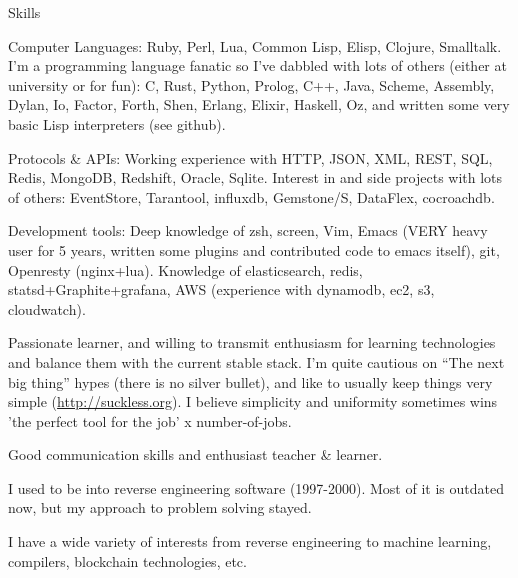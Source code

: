 \documentclass{resume} %
\begin{document}
\begin{rSection}{Skills}

\item Computer Languages: Ruby, Perl, Lua, Common Lisp, Elisp,
  Clojure, Smalltalk.  I'm a programming language fanatic so I've
  dabbled with lots of others (either at university or for fun):
  C, Rust, Python, Prolog, C++, Java, Scheme, Assembly, Dylan, Io, Factor,
  Forth, Shen, Erlang, Elixir, Haskell, Oz, and written some very
  basic Lisp interpreters (see github).

\item Protocols \& APIs: Working experience with HTTP, JSON, XML,
  REST, SQL, Redis, MongoDB, Redshift, Oracle, Sqlite. Interest in and
  side projects with lots of others: EventStore, Tarantool, influxdb,
  Gemstone/S, DataFlex, cocroachdb.

\item Development tools: Deep knowledge of zsh, screen, Vim, Emacs
  (VERY heavy user for 5 years, written some plugins and contributed
  code to emacs itself), git, Openresty (nginx+lua). Knowledge of
  elasticsearch, redis, statsd+Graphite+grafana, AWS (experience with
  dynamodb, ec2, s3, cloudwatch).

\item Passionate learner, and willing to transmit enthusiasm for
  learning technologies and balance them with the current stable
  stack. I'm quite cautious on ``The next big thing'' hypes (there is
  no silver bullet), and like to usually keep things very simple
  (\url{http://suckless.org}). I believe simplicity and uniformity
  sometimes wins 'the perfect tool for the job' x number-of-jobs.

\item Good communication skills and enthusiast teacher \& learner.

\item I used to be into reverse engineering software (1997-2000). Most
  of it is outdated now, but my approach to problem solving stayed.

\item I have a wide variety of interests from reverse engineering to
  machine learning, compilers, blockchain technologies, etc.

\end{rSection}
\end{document}
